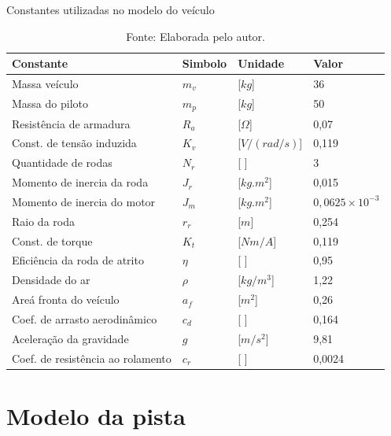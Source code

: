 \begin{table}[H]
	\centering
	\caption{Constantes utilizadas no modelo do veículo}
	\begin{tabular}{llll}
		\toprule
		\textbf{Constante} & \textbf{Simbolo} & \textbf{Unidade} & \textbf{Valor}\\
		\hline
		Massa veículo                       & $m_v$  & [$kg$]              & 36      \\
        Massa do piloto                     & $m_p$  & [$kg$]              & 50      \\
        Resistência de armadura             & $R_a$  & [$\Omega$]        & 0,07    \\  
        Const. de tensão induzida           & $K_v$  & [$V/(rad/s)$]       & 0,119   \\
        Quantidade de rodas                 & $N_r$  & [ ]                & 3       \\
        Momento de inercia da roda          & $J_r$  & [$kg.m^2$]        & 0,015   \\
        Momento de inercia do motor         & $J_m$  & [$kg.m^2$]        & $0,0625 \times 10^{-3}$\\
        Raio da roda                        & $r_r$  & [$m$]               & 0,254   \\
        Const. de torque                    & $K_t$  & [$Nm/A$]            & 0,119   \\
        Eficiência da roda de atrito        & $\eta$ & [ ]                & 0,95    \\
        Densidade do ar                     & $\rho$ & [$kg/m^3$]        & 1,22    \\
        Areá fronta do veículo              & $a_f$  & [$m^2$]           & 0,26    \\
        Coef. de arrasto aerodinâmico       & $c_d$  & [ ]                & 0,164   \\
        Aceleração da gravidade             & $g$    & [$m/s^2$]         & 9,81    \\
        Coef. de resistência ao rolamento   & $c_r$  & [ ]                & 0,0024  \\
		\bottomrule
	\end{tabular}
	\caption*{\footnotesize Fonte: Elaborada pelo autor.}
	\label{tab:constantes}
\end{table}


\section{Modelo da pista}

